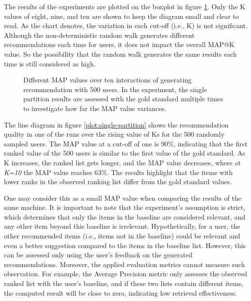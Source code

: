 The results of the experiments are plotted on the boxplot in figure \ref{plot:single-partition-boxplot}. Only the K values of eight, nine, and ten are shown to keep the diagram small and clear to read. As the chart denotes, the variation in each cut-off (i.e., K) is not significant. Although the non-deterministic random walk generates different recommendations each time for users, it does not impact the overall MAP@K value. So the possibility that the random walk generates the same results each time is still considered as high.


\begin{figure}[!htb]
    \centering
    
    \caption{Different MAP values over ten interactions of generating recommendation with 500 users. In the experiment, the single partition results are assessed with the gold standard multiple times to investigate how far the MAP value variances.}
    \label{plot:single-partition-boxplot}
\end{figure}



The line diagram in figure \ref{plot:single-partition} shows the recommendation quality in one of the runs over the rising value of Ks for the 500 randomly sampled users. The MAP value at a cut-off of one is 90\%, indicating that the first ranked value of the 500 users is similar to the first value of the gold standard. As K increases, the ranked list gets longer, and the MAP value decreases, where at \emph{K=10} the MAP value reaches 63\%. The results highlight that the items with lower ranks in the observed ranking list differ from the gold standard values.


One may consider this as a small MAP value when comparing the results of the same machine. It is important to note that the experiment's assumption is strict, which determines that only the items in the baseline are considered relevant, and any other item beyond this baseline is irrelevant. Hypothetically, for a user, the other recommended items (i.e., items not in the baseline) could be relevant and even a better suggestion compared to the items in the baseline list. However, this can be assessed only using the user's feedback on the generated recommendations. Moreover, the applied evaluation metrics cannot measure such observation. For example, the Average Precision metric only assesses the observed ranked list with the user's baseline, and if these two lists contain different items, the computed result will be close to zero, indicating low retrieval effectiveness.


